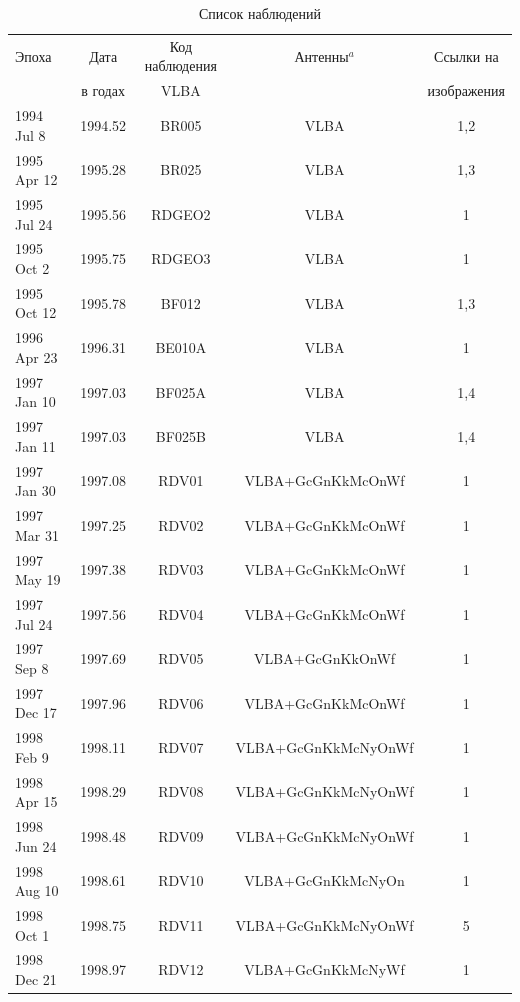 \begin{table}[tbh!]
\tiny
\caption{Список наблюдений}
\label{tab:rdv_obstab}
\centering
\begin{SingleSpace}
\begin{tabular}{lcccc}
\toprule
Эпоха & Дата    & Код наблюдения & Антенны$^{a}$ & Ссылки на \\
      & в годах & VLBA           &               & изображения \\
\midrule
1994 Jul 8  & 1994.52 & BR005  & VLBA                      & 1,2 \\
1995 Apr 12 & 1995.28 & BR025  & VLBA                      & 1,3 \\
1995 Jul 24 & 1995.56 & RDGEO2 & VLBA                      & 1   \\
1995 Oct 2  & 1995.75 & RDGEO3 & VLBA                      & 1   \\
1995 Oct 12 & 1995.78 & BF012  & VLBA                      & 1,3 \\
1996 Apr 23 & 1996.31 & BE010A & VLBA                      & 1   \\
1997 Jan 10 & 1997.03 & BF025A & VLBA                      & 1,4 \\
1997 Jan 11 & 1997.03 & BF025B & VLBA                      & 1,4 \\
1997 Jan 30 & 1997.08 & RDV01  & VLBA+GcGnKkMcOnWf         & 1   \\
1997 Mar 31 & 1997.25 & RDV02  & VLBA+GcGnKkMcOnWf         & 1   \\
1997 May 19 & 1997.38 & RDV03  & VLBA+GcGnKkMcOnWf         & 1   \\
1997 Jul 24 & 1997.56 & RDV04  & VLBA+GcGnKkMcOnWf         & 1   \\
1997 Sep 8  & 1997.69 & RDV05  & VLBA+GcGnKkOnWf           & 1   \\
1997 Dec 17 & 1997.96 & RDV06  & VLBA+GcGnKkMcOnWf         & 1   \\
1998 Feb 9  & 1998.11 & RDV07  & VLBA+GcGnKkMcNyOnWf       & 1   \\
1998 Apr 15 & 1998.29 & RDV08  & VLBA+GcGnKkMcNyOnWf       & 1   \\
1998 Jun 24 & 1998.48 & RDV09  & VLBA+GcGnKkMcNyOnWf       & 1   \\
1998 Aug 10 & 1998.61 & RDV10  & VLBA+GcGnKkMcNyOn         & 1   \\
1998 Oct 1  & 1998.75 & RDV11  & VLBA+GcGnKkMcNyOnWf       & 5   \\
1998 Dec 21 & 1998.97 & RDV12  & VLBA+GcGnKkMcNyWf         & 1   \\

\end{tabular}
\end{SingleSpace}
\end{table}
